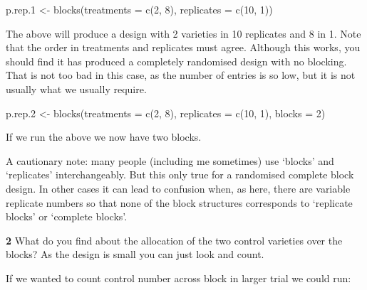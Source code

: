 \documentclass[
]{book}
\makeatletter
\newenvironment{Shaded}{\begin{snugshade}}{\end{snugshade}}
\newcommand{\AttributeTok}[1]{\textcolor[rgb]{0.77,0.63,0.00}{#1}}
\newcommand{\DecValTok}[1]{\textcolor[rgb]{0.00,0.00,0.81}{#1}}
\newcommand{\FloatTok}[1]{\textcolor[rgb]{0.00,0.00,0.81}{#1}}
\newcommand{\FunctionTok}[1]{\textcolor[rgb]{0.00,0.00,0.00}{#1}}
\newcommand{\NormalTok}[1]{#1}
\newcommand{\OtherTok}[1]{\textcolor[rgb]{0.56,0.35,0.01}{#1}}
\newenvironment{kframe}{%
\medskip{}
\setlength{\fboxsep}{.8em}
 \def\at@end@of@kframe{}%
 \ifinner\ifhmode%
  \def\at@end@of@kframe{\end{minipage}}%
  \begin{minipage}{\columnwidth}%
 \fi\fi%
 \def\FrameCommand##1{\hskip\@totalleftmargin \hskip-\fboxsep
 \colorbox{shadecolor}{##1}\hskip-\fboxsep
     \hskip-\linewidth \hskip-\@totalleftmargin \hskip\columnwidth}%
 \MakeFramed {\advance\hsize-\width
   \@totalleftmargin\z@ \linewidth\hsize
   \@setminipage}}%
 {\par\unskip\endMakeFramed%
 \at@end@of@kframe}
\newenvironment{rmdblock}[1]
  {
  \begin{itemize}
  \renewcommand{\labelitemi}{
    \raisebox{-.7\height}[0pt][0pt]{
      {\setkeys{Gin}{width=3em,keepaspectratio}\texttt{[image: images/\#1]}}
    }
  }
  \setlength{\fboxsep}{1em}
  \begin{kframe}
  \item
  }
  {
  \end{kframe}
  \end{itemize}
  }
\newenvironment{rmdquiz}
  {\begin{rmdblock}{quiz}}
  {\end{rmdblock}}
\newenvironment{rmdcaution}
  {\begin{rmdblock}{caution}}
  {\end{rmdblock}}
\makeatother
\begin{document}
\begin{Shaded}
\begin{Highlighting}[]
\NormalTok{p.rep}\FloatTok{.1} \OtherTok{\textless{}{-}} \FunctionTok{blocks}\NormalTok{(}\AttributeTok{treatments =} \FunctionTok{c}\NormalTok{(}\DecValTok{2}\NormalTok{, }\DecValTok{8}\NormalTok{), }\AttributeTok{replicates =} \FunctionTok{c}\NormalTok{(}\DecValTok{10}\NormalTok{, }\DecValTok{1}\NormalTok{))}
\end{Highlighting}
\end{Shaded}

The above will produce a design with 2 varieties in 10 replicates and 8 in 1. Note that the order in treatments and replicates must agree. Although this works, you should find it has produced a completely randomised design with no blocking. That is not too bad in this case, as the number of entries is so low, but it is not usually what we usually require.

\begin{Shaded}
\begin{Highlighting}[]
\NormalTok{p.rep}\FloatTok{.2} \OtherTok{\textless{}{-}} \FunctionTok{blocks}\NormalTok{(}\AttributeTok{treatments =} \FunctionTok{c}\NormalTok{(}\DecValTok{2}\NormalTok{, }\DecValTok{8}\NormalTok{), }\AttributeTok{replicates =} \FunctionTok{c}\NormalTok{(}\DecValTok{10}\NormalTok{, }\DecValTok{1}\NormalTok{), }
    \AttributeTok{blocks =} \DecValTok{2}\NormalTok{)}
\end{Highlighting}
\end{Shaded}

If we run the above we now have two blocks.

\begin{rmdcaution}
A cautionary note: many people (including me sometimes) use `blocks' and `replicates' interchangeably. But this only true for a randomised complete block design. In other cases it can lead to confusion when, as here, there are variable replicate numbers so that none of the block structures corresponds to `replicate blocks' or `complete blocks'.
\end{rmdcaution}

\begin{rmdquiz}
\textbf{2} What do you find about the allocation of the two control varieties over the blocks? As the design is small you can just look and count.
\end{rmdquiz}

If we wanted to count control number across block in larger trial we could run:
\end{document}
